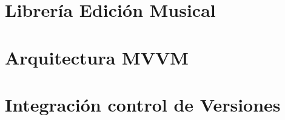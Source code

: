 \section{Librería Edición Musical}
\section{Arquitectura MVVM}
\section{Integración control de Versiones}
